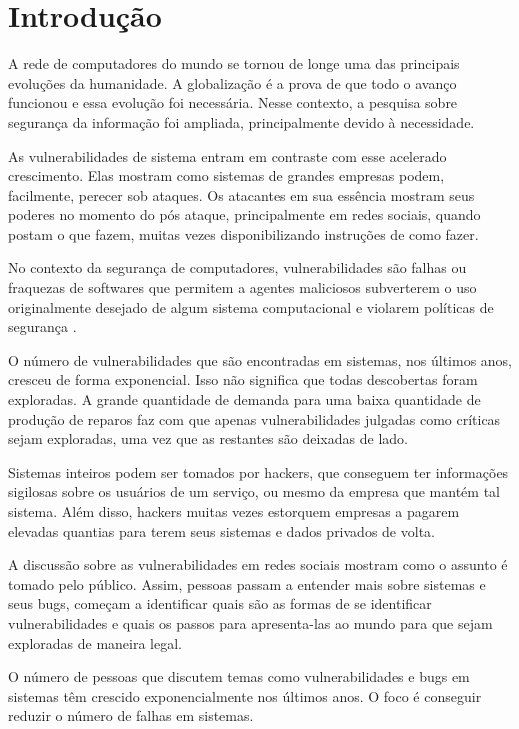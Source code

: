 \chapter[Introdução]{Introdução}

A rede de computadores do mundo se tornou de longe uma das principais evoluções da humanidade. A globalização é a prova de que todo o avanço funcionou e essa evolução foi necessária. Nesse contexto, a pesquisa sobre segurança da informação foi ampliada, principalmente devido à necessidade.

As vulnerabilidades de sistema entram em contraste com esse acelerado crescimento. Elas mostram como sistemas de grandes empresas podem, facilmente, perecer sob ataques. Os atacantes em sua essência mostram seus poderes no momento do pós ataque, principalmente em redes sociais, quando postam o que fazem, muitas vezes disponibilizando instruções de como fazer.

No contexto da segurança de computadores, vulnerabilidades são falhas ou fraquezas de softwares que permitem a agentes maliciosos subverterem o uso originalmente desejado de algum sistema computacional e violarem políticas de segurança \cite{Belarmino2014}. 

O número de vulnerabilidades que são encontradas em sistemas, nos últimos anos, cresceu de forma exponencial. Isso não significa que todas descobertas foram exploradas. A grande quantidade de demanda para uma baixa quantidade de produção de reparos faz com que apenas vulnerabilidades julgadas como críticas sejam exploradas, uma vez que as restantes são deixadas de lado.

Sistemas inteiros podem ser tomados por hackers, que conseguem ter informações sigilosas sobre os usuários de um serviço, ou mesmo da empresa que mantém tal sistema. Além disso, hackers muitas vezes estorquem empresas a pagarem elevadas quantias para terem seus sistemas e dados privados de volta. 

A discussão sobre as vulnerabilidades em redes sociais mostram como o assunto é tomado pelo público. Assim, pessoas passam a entender mais sobre sistemas e seus bugs, começam a identificar quais são as formas de se identificar vulnerabilidades e quais os passos para apresenta-las ao mundo para que sejam exploradas de maneira legal.

O número de pessoas que discutem temas como vulnerabilidades e bugs em sistemas têm crescido exponencialmente nos últimos anos. O foco é conseguir reduzir o número de falhas em sistemas.

